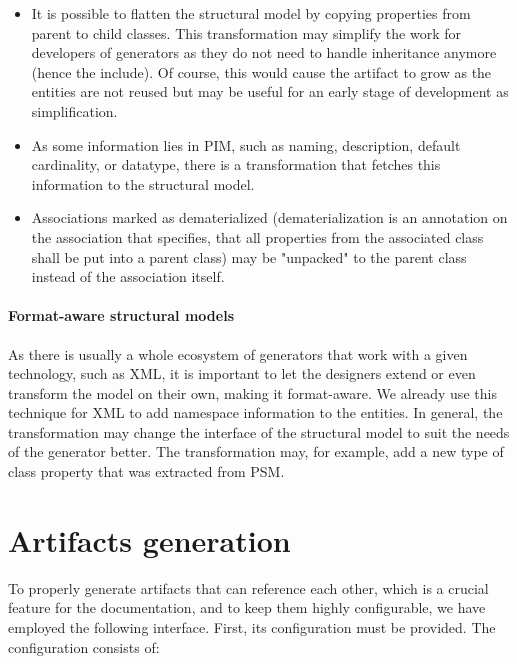 \begin{itemize}
    \item It is possible to flatten the structural model by copying properties from parent to child classes. This transformation may simplify the work for developers of generators as they do not need to handle inheritance anymore (hence the include). Of course, this would cause the artifact to grow as the entities are not reused but may be useful for an early stage of development as simplification.
    \item As some information lies in PIM, such as naming, description, default cardinality, or datatype, there is a transformation that fetches this information to the structural model.
    \item Associations marked as dematerialized (dematerialization is an annotation on the association that specifies, that all properties from the associated class shall be put into a parent class) may be "unpacked" to the parent class instead of the association itself.
\end{itemize}

\paragraph{Format-aware structural models} As there is usually a whole ecosystem of generators that work with a given technology, such as XML, it is important to let the designers extend or even transform the model on their own, making it format-aware. We already use this technique for XML to add namespace information to the entities. In general, the transformation may change the interface of the structural model to suit the needs of the generator better. The transformation may, for example, add a new type of class property that was extracted from PSM.

\section{Artifacts generation}

To properly generate artifacts that can reference each other, which is a crucial feature for the documentation, and to keep them highly configurable, we have employed the following interface. First, its configuration must be provided. The configuration consists of:

